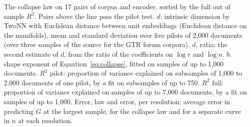 \begin{table}[t]
\caption{The collapse law on 17 pairs of corpus and encoder, sorted by the full out of sample $R^2$. Pairs above the line pass the pilot test. $d$: intrinsic dimension by TwoNN with Euclidean distance between unit embeddings (Euclidean distance on the manifolds), mean and standard deviation over five pilots of 2{,}000 documents (over three samples of the source for the GTR forum corpora). $d$, ratio: the second estimate of $d$, from the ratio of the coefficients on $\log r$ and $\log n$. $b$: shape exponent of Equation~\ref{eq:collapse}, fitted on samples of up to 1{,}000 documents. $R^2$ pilot: proportion of variance explained on subsamples of 1{,}000 to 2{,}000 documents of one pilot, by a fit on subsamples of up to 750. $R^2$ full: proportion of variance explained on samples of up to 7{,}000 documents, by a fit on samples of up to 1{,}000. Error, law and error, per resolution: average error in predicting $G$ at the largest sample, for the collapse law and for a separate curve in $n$ at each resolution.}
\label{tab:collapse}
\end{table}


